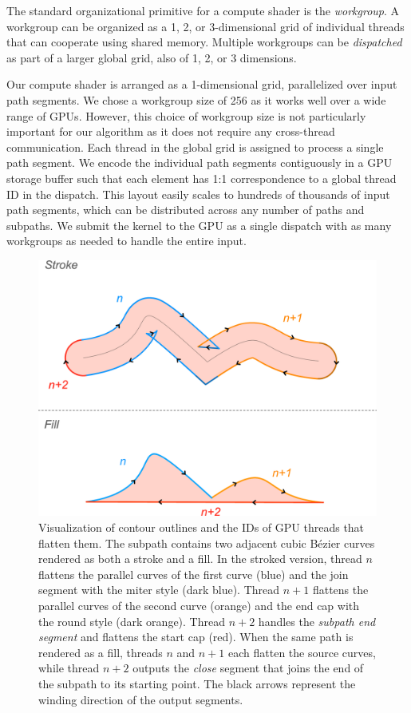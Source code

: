 \documentclass[sigconf, nonacm]{acmart}
\begin{document}
The standard organizational primitive for a compute shader is the \emph{workgroup}. A workgroup can be organized as a 1, 2, or 3-dimensional grid of individual threads that can cooperate using shared memory. Multiple workgroups can be \emph{dispatched} as part of a larger global grid, also of 1, 2, or 3 dimensions.

Our compute shader is arranged as a 1-dimensional grid, parallelized over input path segments. We chose a workgroup size of 256 as it works well over a wide range of GPUs. However, this choice of workgroup size is not particularly important for our algorithm as it does not require any cross-thread communication. Each thread in the global grid is assigned to process a single path segment. We encode the individual path segments contiguously in a GPU storage buffer such that each element has 1:1 correspondence to a global thread ID in the dispatch. This layout easily scales to hundreds of thousands of input path segments, which can be distributed across any number of paths and subpaths. We submit the kernel to the GPU as a single dispatch with as many workgroups as needed to handle the entire input.

\begin{center}
\begin{figure}
    \includegraphics[scale=0.18]{stroke_threads}
    \caption{Visualization of contour outlines and the IDs of GPU threads that flatten them. The subpath contains two adjacent cubic Bézier curves rendered as both a stroke and a fill. In the stroked version, thread $n$ flattens the parallel curves of the first curve (blue) and the join segment with the miter style (dark blue). Thread $n + 1$ flattens the parallel curves of the second curve (orange) and the end cap with the round style (dark orange). Thread $n + 2$ handles the \emph{subpath end segment} and flattens the start cap (red). When the same path is rendered as a fill, threads $n$ and $n + 1$ each flatten the source curves, while thread $n + 2$ outputs the \emph{close} segment that joins the end of the subpath to its starting point. The black arrows represent the winding direction of the output segments.}
    \label{fig:stroke_threads}
\end{figure}
\end{center}
\end{document}
